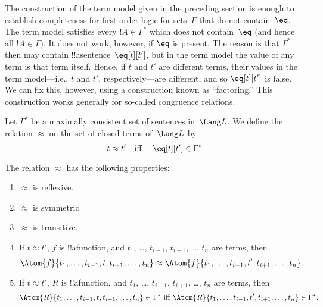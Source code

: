 \documentclass[../../include/open-logic-section]{subfiles}
\begin{document}

\begin{explain}
The construction of the term model given in the preceding section is
enough to establish completeness for first-order logic for
sets~$\Gamma$ that do not contain~$\eq$.  The term model satisfies
every $!A \in \Gamma^*$ which does not contain~$\eq$ (and hence all
$!A \in \Gamma$).  It does not work, however, if $\eq$ is present.
The reason is that $\Gamma^*$ then may contain
!!a{sentence}~$\eq[t][t']$, but in the term model the value of any
term is that term itself. Hence, if $t$ and $t'$ are different terms,
their values in the term model---i.e., $t$ and $t'$,
respectively---are different, and so $\eq[t][t']$ is false.  We can
fix this, however, using a construction known as ``factoring.''  This
construction works generally for so-called congruence relations.
\end{explain}

\begin{defn}
Let $\Gamma^*$ be a maximally consistent set of sentences in~$\Lang
L$. We define the relation $\approx$ on the set of closed terms
of~$\Lang L$ by
\[
t \approx t' \text{\quad iff \quad} \eq[t][t'] \in \Gamma^*
\]
\end{defn}

\begin{prop}
The relation $\approx$ has the following properties:
\begin{enumerate}
\item $\approx$ is reflexive.
\item $\approx$ is symmetric.
\item  $\approx$ is transitive.
\item If $t \approx t'$, $f$ is !!a{function}, and $t_1$, \dots,
  $t_{i-1}$, $t_{i+1}$, \dots, $t_n$ are terms, then 
\[
\Atom{f}{t_1,\dots, t_{i-1}, t, t_{i+1}, \dots, t_n} \approx 
\Atom{f}{t_1,\dots, t_{i-1}, t', t_{i+1}, \dots, t_n}.
\]
\item If $t \approx t'$, $R$ is !!a{function}, and $t_1$, \dots,
  $t_{i-1}$, $t_{i+1}$, \dots, $t_n$ are terms, then 
\[
\Atom{R}{t_1,\dots, t_{i-1}, t, t_{i+1}, \dots, t_n} \in \Gamma^* \text{ iff } 
\Atom{R}{t_1,\dots, t_{i-1}, t', t_{i+1}, \dots, t_n} \in \Gamma^*.
\]
\end{enumerate}
\end{prop}
\end{document}
